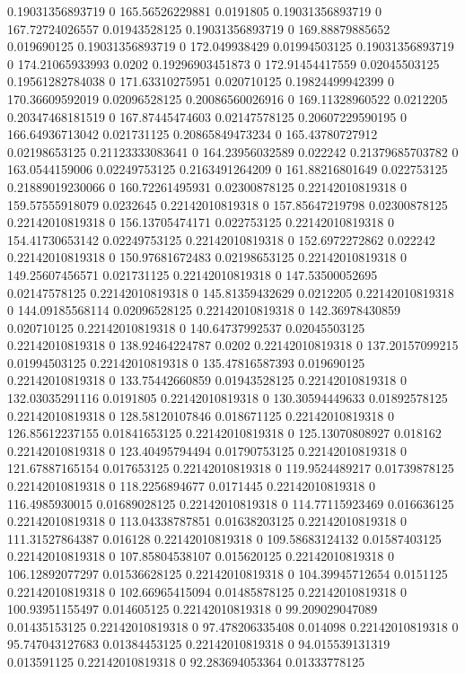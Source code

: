 0.19031356893719 0 165.56526229881 0.0191805
0.19031356893719 0 167.72724026557 0.01943528125
0.19031356893719 0 169.88879885652 0.019690125
0.19031356893719 0 172.049938429 0.01994503125
0.19031356893719 0 174.21065933993 0.0202
0.19296903451873 0 172.91454417559 0.02045503125
0.19561282784038 0 171.63310275951 0.020710125
0.19824499942399 0 170.36609592019 0.02096528125
0.20086560026916 0 169.11328960522 0.0212205
0.20347468181519 0 167.87445474603 0.02147578125
0.20607229590195 0 166.64936713042 0.021731125
0.20865849473234 0 165.43780727912 0.02198653125
0.21123333083641 0 164.23956032589 0.022242
0.21379685703782 0 163.0544159006 0.02249753125
0.2163491264209 0 161.88216801649 0.022753125
0.21889019230066 0 160.72261495931 0.02300878125
0.22142010819318 0 159.57555918079 0.0232645
0.22142010819318 0 157.85647219798 0.02300878125
0.22142010819318 0 156.13705474171 0.022753125
0.22142010819318 0 154.41730653142 0.02249753125
0.22142010819318 0 152.6972272862 0.022242
0.22142010819318 0 150.97681672483 0.02198653125
0.22142010819318 0 149.25607456571 0.021731125
0.22142010819318 0 147.53500052695 0.02147578125
0.22142010819318 0 145.81359432629 0.0212205
0.22142010819318 0 144.09185568114 0.02096528125
0.22142010819318 0 142.36978430859 0.020710125
0.22142010819318 0 140.64737992537 0.02045503125
0.22142010819318 0 138.92464224787 0.0202
0.22142010819318 0 137.20157099215 0.01994503125
0.22142010819318 0 135.47816587393 0.019690125
0.22142010819318 0 133.75442660859 0.01943528125
0.22142010819318 0 132.03035291116 0.0191805
0.22142010819318 0 130.30594449633 0.01892578125
0.22142010819318 0 128.58120107846 0.018671125
0.22142010819318 0 126.85612237155 0.01841653125
0.22142010819318 0 125.13070808927 0.018162
0.22142010819318 0 123.40495794494 0.01790753125
0.22142010819318 0 121.67887165154 0.017653125
0.22142010819318 0 119.9524489217 0.01739878125
0.22142010819318 0 118.2256894677 0.0171445
0.22142010819318 0 116.4985930015 0.01689028125
0.22142010819318 0 114.77115923469 0.016636125
0.22142010819318 0 113.04338787851 0.01638203125
0.22142010819318 0 111.31527864387 0.016128
0.22142010819318 0 109.58683124132 0.01587403125
0.22142010819318 0 107.85804538107 0.015620125
0.22142010819318 0 106.12892077297 0.01536628125
0.22142010819318 0 104.39945712654 0.0151125
0.22142010819318 0 102.66965415094 0.01485878125
0.22142010819318 0 100.93951155497 0.014605125
0.22142010819318 0 99.209029047089 0.01435153125
0.22142010819318 0 97.478206335408 0.014098
0.22142010819318 0 95.747043127683 0.01384453125
0.22142010819318 0 94.015539131319 0.013591125
0.22142010819318 0 92.283694053364 0.01333778125
